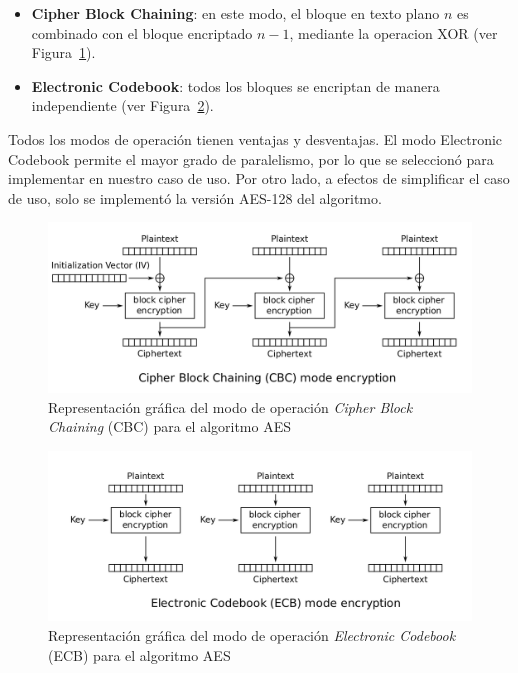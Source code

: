 \documentclass[11pt]{article}
\newcommand{\english}[1]{\textit{#1}}
\begin{document}
\begin{itemize}
    \item \textbf{Cipher Block Chaining}: en este modo, el bloque en texto plano $n$ es combinado con el bloque encriptado $n - 1$, mediante la operacion XOR (ver Figura~\ref{fig:aes_cbc}).
    \item \textbf{Electronic Codebook}: todos los bloques se encriptan de manera independiente (ver Figura~\ref{fig:aes_ecb}).
\end{itemize}

Todos los modos de operación tienen ventajas y desventajas. El modo Electronic Codebook permite el mayor grado de paralelismo, por lo que se seleccionó para implementar en nuestro caso de uso. Por otro lado, a efectos de simplificar el caso de uso, solo se implementó la versión AES-128 del algoritmo.

\begin{figure}[h]
    \centering
    \includegraphics[scale=0.2]{resources/aes/cbc.png}
    \caption{Representación gráfica del modo de operación \english{Cipher Block Chaining} (CBC) para el algoritmo AES}
    \label{fig:aes_cbc}
\end{figure}

\begin{figure}[h]
    \centering
    \includegraphics[scale=0.2]{resources/aes/ecb.png}
    \caption{Representación gráfica del modo de operación \english{Electronic Codebook} (ECB) para el algoritmo AES}
    \label{fig:aes_ecb}
\end{figure}
\end{document}
